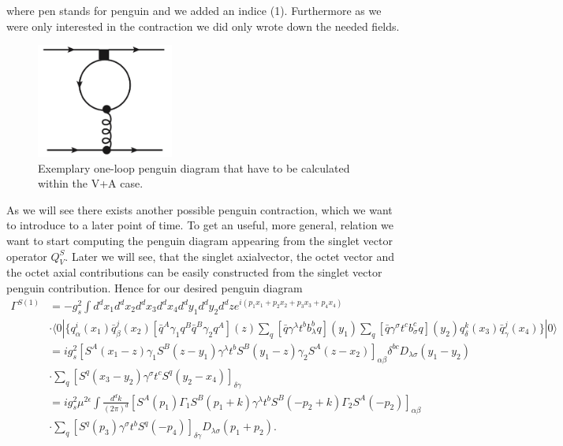 	where pen stands for penguin and we added an indice (1). Furthermore as we were only interested in the contraction we did only wrote down the needed fields. 
\begin{figure}[thb]
\centering
\includegraphics[width=0.4\textwidth]{penguinDiagram.jpg}
\caption{Exemplary one-loop penguin diagram that have to be calculated within the V+A case.}
\label{fig:penguinDiagram}
\end{figure}
As we will see there exists another possible penguin contraction, which we want to introduce to a later point of time. To get an useful, more general, relation we want to start computing the penguin diagram appearing from the singlet vector operator $Q^S_V$. Later we will see, that the singlet axialvector, the octet vector and the octet axial contributions can be easily constructed from the singlet vector penguin contribution. Hence for our desired penguin diagram 
	\begin{equation}
		\begin{split}
			\Gamma^{S(1)} &= - g_s^2 \int d^dx_1 d^dx_2 d^dx_3 d^dx_4 d^dy_1 d^d y_2 d^d z e^{i(p_1x_1 + p_2x_2 + p_3x_3 + p_4x_4)} \\	
			& \cdot  \langle 0  | \{ q^i_\alpha (x_1) \bar q^j_\beta (x_2) [ \bar q^A \gamma_1 q^B \bar q^B \gamma_2 q^A ] (z) \sum_q [\bar q \gamma^\lambda t^b b^b_\lambda q ] (y_1) \sum_q [\bar q \gamma^\sigma t^c b^c_\sigma q ] (y_2) q^k_\delta (x_3) \bar q^j_\gamma (x_4) \}  | 0  \rangle \\				
			&= ig_s^2 [S^A(x_1-z) \gamma_1 S^B(z-y_1) \gamma^\lambda t^b S^B(y_1-z) \gamma_2 S^A(z-x_2)]_{\alpha\beta} \delta^{bc} D_{\lambda\sigma} (y_1 - y_2) \\
			&\cdot \sum_q [S^q(x_3 - y_2) \gamma^\sigma t^c S^q(y_2 - x_4)]_{\delta\gamma} \\
			 &= ig^2_s \mu^{2\epsilon} \int \frac{d^dk}{(2\pi)^d} [S^A(p_1) \Gamma_1 S^B(p_1+k) \gamma^\lambda t^b S^B(-p_2 + k) \Gamma_2 S^A(-p_2)]_{\alpha\beta} \\
			&\cdot \sum_q [S^q(p_3) \gamma^\sigma t^b S^q(-p_4) ]_{\delta\gamma} D_{\lambda\sigma}(p_1+p_2) .
		\end{split}	
	\end{equation}
